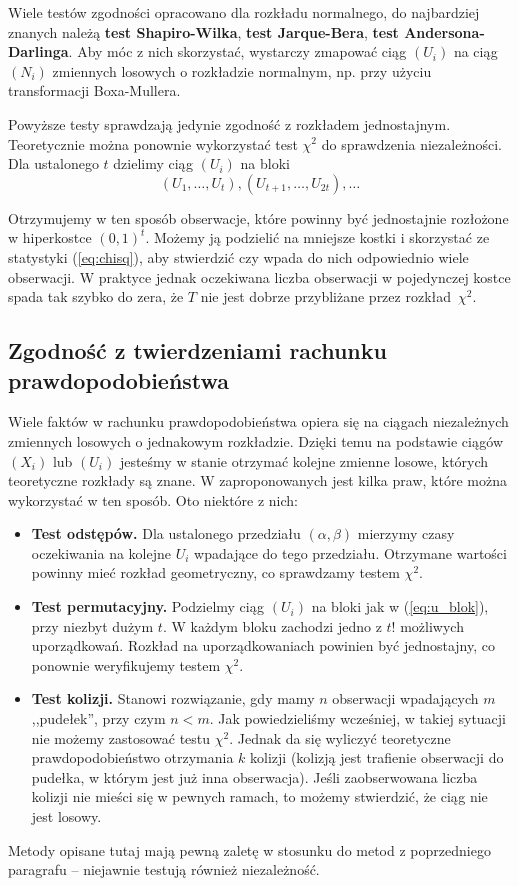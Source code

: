 \documentclass[a4paper,11pt,twoside]{book}
\theoremstyle{definition}
\begin{document}
Wiele testów zgodności opracowano dla rozkładu normalnego, do najbardziej znanych należą \textbf{test Shapiro-Wilka}, \textbf{test Jarque-Bera}, \textbf{test Andersona-Darlinga}. Aby móc z nich skorzystać, wystarczy zmapować ciąg $(U_i)$ na ciąg $(N_i)$ zmiennych losowych o rozkładzie normalnym, np. przy użyciu transformacji Boxa-Mullera.

Powyższe testy sprawdzają jedynie zgodność z rozkładem jednostajnym. Teoretycznie można ponownie wykorzystać test $\chi^2$ do sprawdzenia niezależności. Dla ustalonego $t$ dzielimy ciąg $(U_i)$ na bloki 
\begin{equation}
  \label{eq:u_blok}
 (U_1,\ldots,U_t), (U_{t+1},\ldots,U_{2t}), \ldots
\end{equation}

Otrzymujemy w ten sposób obserwacje, które powinny być jednostajnie rozłożone w hiperkostce $(0,1)^t$. Możemy ją podzielić na mniejsze kostki i skorzystać ze statystyki (\ref{eq:chisq}), aby stwierdzić czy wpada do nich odpowiednio wiele obserwacji. W praktyce jednak oczekiwana liczba obserwacji w pojedynczej kostce spada tak szybko do zera, że $T$ nie jest dobrze przybliżane przez rozkład~$\chi^2$.

\subsection*{Zgodność z twierdzeniami rachunku prawdopodobieństwa}
Wiele faktów w rachunku prawdopodobieństwa opiera się na ciągach niezależnych zmiennych losowych o jednakowym rozkładzie. Dzięki temu na podstawie ciągów $(X_i)$ lub $(U_i)$ jesteśmy w stanie otrzymać kolejne zmienne losowe, których teoretyczne rozkłady są znane. W \cite{knuth} zaproponowanych jest kilka praw, które można wykorzystać w ten sposób. Oto niektóre z nich:
\begin{itemize}
 \item \textbf{Test odstępów.} Dla ustalonego przedziału $(\alpha, \beta)$ mierzymy czasy oczekiwania na kolejne $U_i$ wpadające do tego przedziału. Otrzymane wartości powinny mieć rozkład geometryczny, co sprawdzamy testem $\chi^2$.
 \item \textbf{Test permutacyjny.} Podzielmy ciąg $(U_i)$ na bloki jak w (\ref{eq:u_blok}),  przy niezbyt dużym $t$. W każdym bloku zachodzi jedno z $t!$ możliwych uporządkowań. Rozkład na uporządkowaniach powinien być jednostajny, co ponownie weryfikujemy testem $\chi^2$.
 \item \textbf{Test kolizji.} Stanowi rozwiązanie, gdy mamy $n$ obserwacji wpadających $m$ ,,pudełek'', przy czym $n < m$. Jak powiedzieliśmy wcześniej, w takiej sytuacji nie możemy zastosować testu $\chi^2$. Jednak da się wyliczyć teoretyczne prawdopodobieństwo otrzymania $k$ kolizji (kolizją jest trafienie obserwacji do pudełka, w którym jest już inna obserwacja). Jeśli zaobserwowana liczba kolizji nie mieści się w pewnych ramach, to możemy stwierdzić, że ciąg nie jest losowy.
\end{itemize}
Metody opisane tutaj mają pewną zaletę w stosunku do metod z poprzedniego paragrafu -- niejawnie testują również niezależność.
\end{document}
